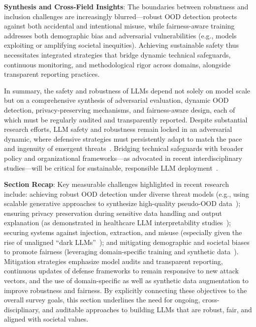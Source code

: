 \documentclass[sigconf]{acmart}
\begin{document}
\textbf{Synthesis and Cross-Field Insights}: The boundaries between robustness and inclusion challenges are increasingly blurred---robust OOD detection protects against both accidental and intentional misuse, while fairness-aware training addresses both demographic bias and adversarial vulnerabilities (e.g., models exploiting or amplifying societal inequities). Achieving sustainable safety thus necessitates integrated strategies that bridge dynamic technical safeguards, continuous monitoring, and methodological rigor across domains, alongside transparent reporting practices.

In summary, the safety and robustness of LLMs depend not solely on model scale but on a comprehensive synthesis of adversarial evaluation, dynamic OOD detection, privacy-preserving mechanisms, and fairness-aware design, each of which must be regularly audited and transparently reported. Despite substantial research efforts, LLM safety and robustness remain locked in an adversarial dynamic, where defensive strategies must persistently adapt to match the pace and ingenuity of emergent threats~\cite{ref1,ref43,ref78,ref82}. Bridging technical safeguards with broader policy and organizational frameworks---as advocated in recent interdisciplinary studies---will be critical for sustainable, responsible LLM deployment~\cite{ref22,ref52}.

\textbf{Section Recap}: Key measurable challenges highlighted in recent research include: achieving robust OOD detection under diverse threat models (e.g., using scalable generative approaches to synthesize high-quality pseudo-OOD data~\cite{ref78}); ensuring privacy preservation during sensitive data handling and output explanation (as demonstrated in healthcare LLM interpretability studies~\cite{ref1}); securing systems against injection, extraction, and misuse (especially given the rise of unaligned ``dark LLMs''~\cite{ref82}); and mitigating demographic and societal biases to promote fairness (leveraging domain-specific training and synthetic data~\cite{ref2}). Mitigation strategies emphasize model audits and transparent reporting, continuous updates of defense frameworks to remain responsive to new attack vectors, and the use of domain-specific as well as synthetic data augmentation to improve robustness and fairness. By explicitly connecting these objectives to the overall survey goals, this section underlines the need for ongoing, cross-disciplinary, and auditable approaches to building LLMs that are robust, fair, and aligned with societal values.
\end{document}
